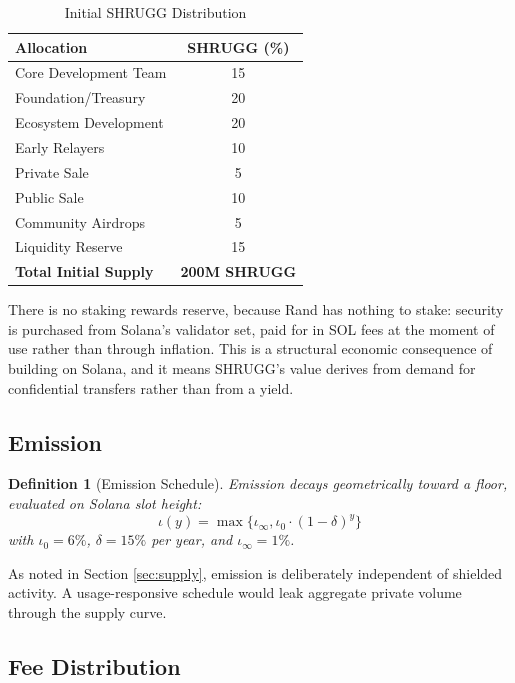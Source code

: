 \documentclass[11pt,a4paper]{article}
\newtheorem{definition}[theorem]{Definition}
\begin{document}
\begin{table}[H]
\centering
\caption{Initial SHRUGG Distribution}
\begin{tabular}{@{}lc@{}}
\toprule
\textbf{Allocation} & \textbf{SHRUGG (\%)} \\ \midrule
Core Development Team & 15 \\
Foundation/Treasury & 20 \\
Ecosystem Development & 20 \\
Early Relayers & 10 \\
Private Sale & 5 \\
Public Sale & 10 \\
Community Airdrops & 5 \\
Liquidity Reserve & 15 \\ \midrule
\textbf{Total Initial Supply} & \textbf{200M SHRUGG} \\ \bottomrule
\end{tabular}
\end{table}

There is no staking rewards reserve, because Rand has nothing to stake: security is purchased from Solana's validator set, paid for in SOL fees at the moment of use rather than through inflation. This is a structural economic consequence of building on Solana, and it means SHRUGG's value derives from demand for confidential transfers rather than from a yield.

\subsection{Emission}

\begin{definition}[Emission Schedule]
Emission decays geometrically toward a floor, evaluated on Solana slot height:
\begin{equation}
\iota(y) = \max\{\iota_\infty, \iota_0 \cdot (1-\delta)^y\}
\end{equation}
with $\iota_0 = 6\%$, $\delta = 15\%$ per year, and $\iota_\infty = 1\%$.
\end{definition}

As noted in Section \ref{sec:supply}, emission is deliberately independent of shielded activity. A usage-responsive schedule would leak aggregate private volume through the supply curve.

\subsection{Fee Distribution}
\end{document}
